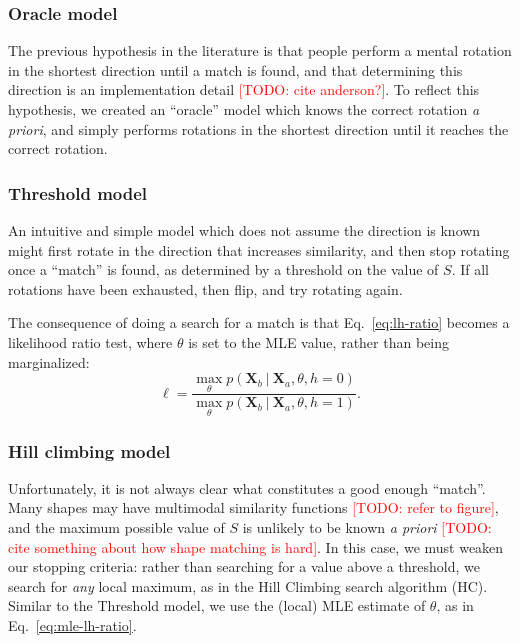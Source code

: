 \documentclass[10pt,letterpaper]{article}
\newcommand{\TODO}[1]{\textcolor{red}{[TODO: #1]}}
\newcommand{\Xa}[0]{\mathbf{X}_a}
\newcommand{\Xb}[0]{\mathbf{X}_b}
\newcommand{\hi}[0]{h=0}
\newcommand{\hf}[0]{h=1}
\newcommand{\Oc}[0]{Oracle}
\newcommand{\Th}[0]{Threshold}
\newcommand{\Hc}[0]{HC}
\begin{document}
\subsubsection{\Oc{} model}

The previous hypothesis in the literature is that people perform a
mental rotation in the shortest direction until a match is found, and
that determining this direction is an implementation detail \TODO{cite
  anderson?}. To reflect this hypothesis, we created an ``oracle''
model which knows the correct rotation \textit{a priori}, and simply
performs rotations in the shortest direction until it reaches the
correct rotation.

\subsubsection{\Th{} model}

An intuitive and simple model which does not assume the direction is
known might first rotate in the direction that increases similarity,
and then stop rotating once a ``match'' is found, as determined by a
threshold on the value of $S$. If all rotations have been exhausted,
then flip, and try rotating again.

The consequence of doing a search for a match is that
Eq.~\ref{eq:lh-ratio} becomes a likelihood ratio test, where $\theta$
is set to the MLE value, rather than being marginalized:
\begin{equation}
  \ell = \frac{\max_\theta p(\Xb\ \vert\ \Xa, \theta, \hi)}{\max_\theta p(\Xb\ \vert\ \Xa, \theta, \hf)}.
  \label{eq:mle-lh-ratio}
\end{equation}

\subsubsection{Hill climbing model}

Unfortunately, it is not always clear what constitutes a good enough
``match''. Many shapes may have multimodal similarity functions
\TODO{refer to figure}, and the maximum possible value of $S$ is
unlikely to be known \textit{a priori} \TODO{cite something about how
  shape matching is hard}. In this case, we must weaken our stopping
criteria: rather than searching for a value above a threshold, we
search for \textit{any} local maximum, as in the Hill Climbing search
algorithm (\Hc{}). Similar to the \Th{} model, we use the (local) MLE
estimate of $\theta$, as in Eq.~\ref{eq:mle-lh-ratio}.
\end{document}
